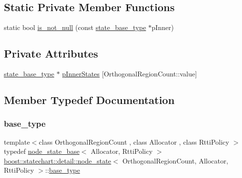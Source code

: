 \subsection*{Static Private Member Functions}
\begin{DoxyCompactItemize}
\item 
static bool \mbox{\hyperlink{classboost_1_1statechart_1_1detail_1_1node__state_a58441ed647eb2389e12c3bf341005047}{is\+\_\+not\+\_\+null}} (const \mbox{\hyperlink{classboost_1_1statechart_1_1detail_1_1node__state__base_a2b7ddb7642a5452045d9448444426735}{state\+\_\+base\+\_\+type}} $\ast$p\+Inner)
\end{DoxyCompactItemize}
\subsection*{Private Attributes}
\begin{DoxyCompactItemize}
\item 
\mbox{\hyperlink{classboost_1_1statechart_1_1detail_1_1node__state__base_a2b7ddb7642a5452045d9448444426735}{state\+\_\+base\+\_\+type}} $\ast$ \mbox{\hyperlink{classboost_1_1statechart_1_1detail_1_1node__state_a5846a2cfb93ebd33d1de2c3beec1f29f}{p\+Inner\+States}} \mbox{[}Orthogonal\+Region\+Count\+::value\mbox{]}
\end{DoxyCompactItemize}


\subsection{Member Typedef Documentation}
\mbox{\label{classboost_1_1statechart_1_1detail_1_1node__state_a6ca25f58492e36e3a2a1b234925c5199}} 
\subsubsection{\texorpdfstring{base\+\_\+type}{base\_type}}
{\footnotesize\ttfamily template$<$class Orthogonal\+Region\+Count , class Allocator , class Rtti\+Policy $>$ \\
typedef \mbox{\hyperlink{classboost_1_1statechart_1_1detail_1_1node__state__base}{node\+\_\+state\+\_\+base}}$<$ Allocator, Rtti\+Policy $>$ \mbox{\hyperlink{classboost_1_1statechart_1_1detail_1_1node__state}{boost\+::statechart\+::detail\+::node\+\_\+state}}$<$ Orthogonal\+Region\+Count, Allocator, Rtti\+Policy $>$\+::\mbox{\hyperlink{classboost_1_1statechart_1_1detail_1_1node__state__base_a6a4897d400d9fb49ee9a7dac1f6c6f58}{base\+\_\+type}}\hspace{0.3cm}{\ttfamily [private]}}

